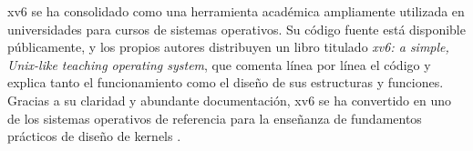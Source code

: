 xv6 se ha consolidado como una herramienta académica ampliamente utilizada en universidades para cursos de sistemas operativos. Su código fuente está disponible públicamente, y los propios autores distribuyen un libro titulado \textit{xv6: a simple, Unix-like teaching operating system}, que comenta línea por línea el código y explica tanto el funcionamiento como el diseño de sus estructuras y funciones. Gracias a su claridad y abundante documentación, xv6 se ha convertido en uno de los sistemas operativos de referencia para la enseñanza de fundamentos prácticos de diseño de kernels \citep{mit2022}.  
